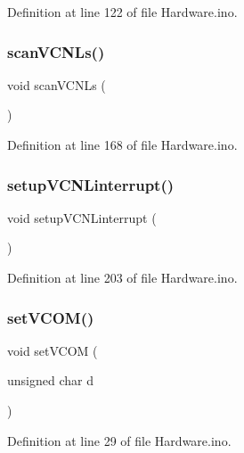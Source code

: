 Definition at line 122 of file Hardware.\+ino.

\mbox{\label{_hardware_8ino_a1d0e244aa65596a3fe94bf5c1dec999c}} 
\subsubsection{\texorpdfstring{scanVCNLs()}{scanVCNLs()}}
{\footnotesize\ttfamily void scan\+V\+C\+N\+Ls (\begin{DoxyParamCaption}{ }\end{DoxyParamCaption})}



Definition at line 168 of file Hardware.\+ino.

\mbox{\label{_hardware_8ino_ad64732af63d21d2459a2b99a71007975}} 
\subsubsection{\texorpdfstring{setupVCNLinterrupt()}{setupVCNLinterrupt()}}
{\footnotesize\ttfamily void setup\+V\+C\+N\+Linterrupt (\begin{DoxyParamCaption}{ }\end{DoxyParamCaption})}



Definition at line 203 of file Hardware.\+ino.

\mbox{\label{_hardware_8ino_afa31143bec2c1e8b0b40e5806275fe66}} 
\subsubsection{\texorpdfstring{setVCOM()}{setVCOM()}}
{\footnotesize\ttfamily void set\+V\+C\+OM (\begin{DoxyParamCaption}\item[{unsigned char}]{d }\end{DoxyParamCaption})}



Definition at line 29 of file Hardware.\+ino.

